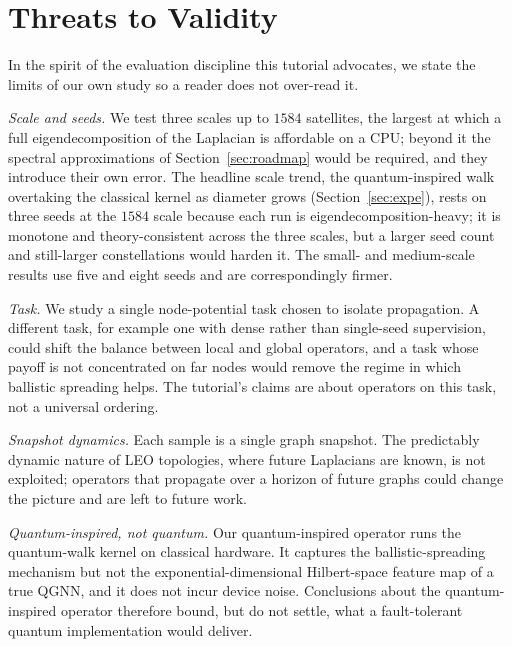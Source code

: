 \section{Threats to Validity}
\label{sec:threats}

In the spirit of the evaluation discipline this tutorial advocates, we state the limits
of our own study so a reader does not over-read it.

\textit{Scale and seeds.} We test three scales up to $1584$ satellites, the largest at
which a full eigendecomposition of the Laplacian is affordable on a CPU; beyond it the
spectral approximations of Section~\ref{sec:roadmap} would be required, and they introduce
their own error. The headline scale trend, the quantum-inspired walk overtaking the
classical kernel as diameter grows (Section~\ref{sec:expe}), rests on three seeds at the
$1584$ scale because each run is eigendecomposition-heavy; it is monotone and
theory-consistent across the three scales, but a larger seed count and still-larger
constellations would harden it. The small- and medium-scale results use five and eight
seeds and are correspondingly firmer.

\textit{Task.} We study a single node-potential task chosen to isolate propagation.
A different task, for example one with dense rather than single-seed supervision, could
shift the balance between local and global operators, and a task whose payoff is not
concentrated on far nodes would remove the regime in which ballistic spreading helps.
The tutorial's claims are about operators on this task, not a universal ordering.

\textit{Snapshot dynamics.} Each sample is a single graph snapshot. The predictably
dynamic nature of LEO topologies, where future Laplacians are known, is not exploited;
operators that propagate over a horizon of future graphs could change the picture and
are left to future work.

\textit{Quantum-inspired, not quantum.} Our quantum-inspired operator runs the
quantum-walk kernel on classical hardware. It captures the ballistic-spreading
mechanism but not the exponential-dimensional Hilbert-space feature map of a true
QGNN, and it does not incur device noise. Conclusions about the quantum-inspired
operator therefore bound, but do not settle, what a fault-tolerant quantum
implementation would deliver.
